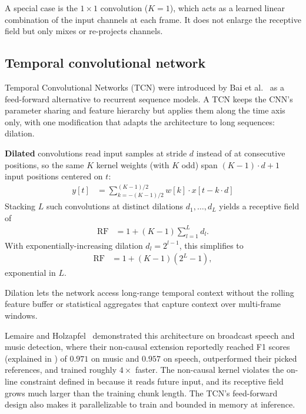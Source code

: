 A special case is the $1{\times}1$ convolution ($K = 1$), which acts as a learned linear combination of the input channels at each frame.
It does not enlarge the receptive field but only mixes or re-projects channels.

\subsection{Temporal convolutional network}
Temporal Convolutional Networks (TCN) were introduced by Bai et al.~\cite{bai2018tcn} as a feed-forward alternative to recurrent sequence models.
A TCN keeps the CNN's parameter sharing and feature hierarchy but applies them along the time axis only, with one modification that adapts the architecture to long sequences: dilation.

\textbf{Dilated} convolutions read input samples at stride $d$ instead of at consecutive positions, so the same $K$ kernel weights (with $K$ odd) span $(K-1)\cdot d + 1$ input positions centered on $t$:
\begin{align}
\label{eq:dilated_conv}
y[t] &= \sum_{k=-(K-1)/2}^{(K-1)/2} w[k] \cdot x[t - k \cdot d]
\end{align}
Stacking $L$ such convolutions at distinct dilations $d_1, \ldots, d_L$ yields a receptive field of
\begin{align}
\label{eq:tcn_rf_general}
\mathrm{RF} &= 1 + (K-1) \sum_{l=1}^{L} d_l.
\end{align}
With exponentially-increasing dilation $d_l = 2^{l-1}$, this simplifies to
\begin{align}
\label{eq:tcn_rf_geom}
\mathrm{RF} &= 1 + (K-1)(2^L - 1),
\end{align}
exponential in $L$.

Dilation lets the network access long-range temporal context without the rolling feature buffer or statistical aggregates that capture context over multi-frame windows.

Lemaire and Holzapfel~\cite{lemaire2019tcn} demonstrated this architecture on broadcast speech and music detection, where their non-causal extension reportedly reached F1 scores (explained in ) of $0.971$ on music and $0.957$ on speech, outperformed their picked references, and trained roughly $4\times$ faster.
The non-causal kernel violates the on-line constraint defined in  because it reads future input, and its receptive field grows much larger than the training chunk length.
The TCN's feed-forward design also makes it parallelizable to train and bounded in memory at inference.

